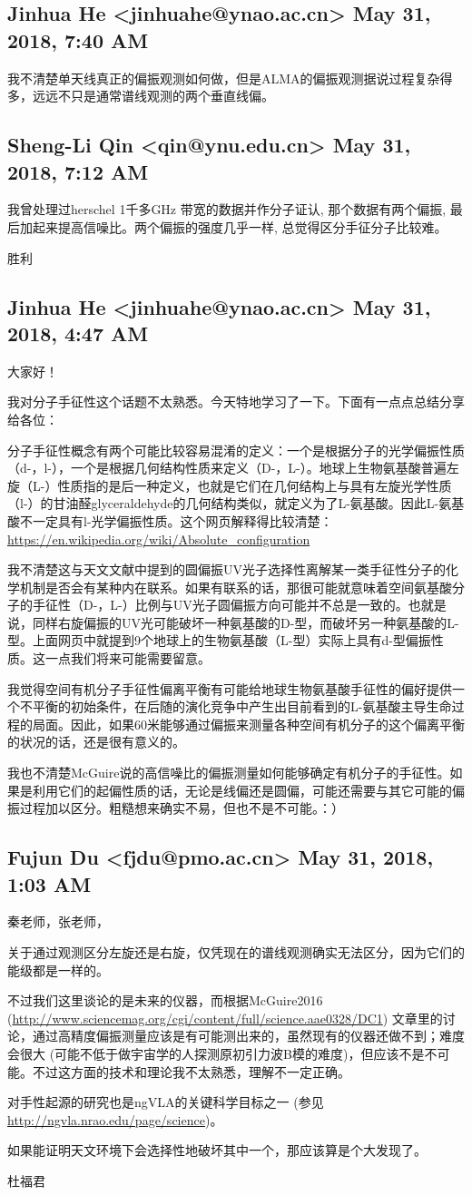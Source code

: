 \documentclass{article}
\newcommand\from[2]{\subsection{{#1} {#2}}}
\newcommand\said[1]{#1}
\begin{document}
\from{
Jinhua He <jinhuahe@ynao.ac.cn>
}{
May 31, 2018, 7:40 AM
}
\said{
我不清楚单天线真正的偏振观测如何做，但是ALMA的偏振观测据说过程复杂得多，远远不只是通常谱线观测的两个垂直线偏。
}

\from{
Sheng-Li Qin <qin@ynu.edu.cn>
}{
May 31, 2018, 7:12 AM
}
\said{

我曾处理过herschel 1千多GHz 带宽的数据并作分子证认, 那个数据有两个偏振, 最后加起来提高信噪比。两个偏振的强度几乎一样, 总觉得区分手征分子比较难。

胜利
}


\from{
Jinhua He <jinhuahe@ynao.ac.cn>
}{
May 31, 2018, 4:47 AM
}
\said{

大家好！

我对分子手征性这个话题不太熟悉。今天特地学习了一下。下面有一点点总结分享给各位：

分子手征性概念有两个可能比较容易混淆的定义：一个是根据分子的光学偏振性质（d-，l-），一个是根据几何结构性质来定义（D-，L-）。地球上生物氨基酸普遍左旋（L-）性质指的是后一种定义，也就是它们在几何结构上与具有左旋光学性质（l-）的甘油醛glyceraldehyde的几何结构类似，就定义为了L-氨基酸。因此L-氨基酸不一定具有l-光学偏振性质。这个网页解释得比较清楚：\url{https://en.wikipedia.org/wiki/Absolute_configuration}

我不清楚这与天文文献中提到的圆偏振UV光子选择性离解某一类手征性分子的化学机制是否会有某种内在联系。如果有联系的话，那很可能就意味着空间氨基酸分子的手征性（D-，L-）比例与UV光子圆偏振方向可能并不总是一致的。也就是说，同样右旋偏振的UV光可能破坏一种氨基酸的D-型，而破坏另一种氨基酸的L-型。上面网页中就提到9个地球上的生物氨基酸（L-型）实际上具有d-型偏振性质。这一点我们将来可能需要留意。

我觉得空间有机分子手征性偏离平衡有可能给地球生物氨基酸手征性的偏好提供一个不平衡的初始条件，在后随的演化竞争中产生出目前看到的L-氨基酸主导生命过程的局面。因此，如果60米能够通过偏振来测量各种空间有机分子的这个偏离平衡的状况的话，还是很有意义的。

我也不清楚McGuire说的高信噪比的偏振测量如何能够确定有机分子的手征性。如果是利用它们的起偏性质的话，无论是线偏还是圆偏，可能还需要与其它可能的偏振过程加以区分。粗糙想来确实不易，但也不是不可能。：）
}

\from{
Fujun Du <fjdu@pmo.ac.cn>
}{
May 31, 2018, 1:03 AM
}
\said{
秦老师，张老师，

关于通过观测区分左旋还是右旋，仅凭现在的谱线观测确实无法区分，因为它们的能级都是一样的。

不过我们这里谈论的是未来的仪器，而根据McGuire2016 (\url{http://www.sciencemag.org/cgi/content/full/science.aae0328/DC1}) 文章里的讨论，通过高精度偏振测量应该是有可能测出来的，虽然现有的仪器还做不到；难度会很大 (可能不低于做宇宙学的人探测原初引力波B模的难度)，但应该不是不可能。不过这方面的技术和理论我不太熟悉，理解不一定正确。

对手性起源的研究也是ngVLA的关键科学目标之一 (参见\url{http://ngvla.nrao.edu/page/science})。

如果能证明天文环境下会选择性地破坏其中一个，那应该算是个大发现了。

杜福君
}
\end{document}
